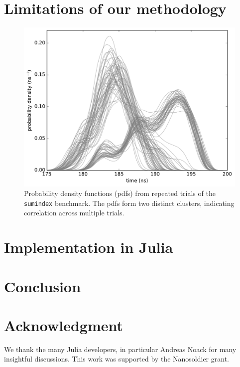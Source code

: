 \documentclass[conference]{IEEEtran}
\begin{document}
\label{sec:limits}
\section{Limitations of our methodology}

\begin{figure}[!t]
\centering
\includegraphics[width=\columnwidth]{figures/fig4/kde_pdf_sumindex}
\caption{Probability density functions (pdfs) from repeated trials of the
\lstinline|sumindex| benchmark. The pdfs form two distinct clusters, indicating
correlation across multiple trials.}
\label{fig:pdfsumindex}
\end{figure}

\label{sec:julia}
\section{Implementation in Julia}

\label{sec:conclusion}
\section{Conclusion}

\label{sec:acknowledgement}
\section*{Acknowledgment}

We thank the many Julia developers, in particular Andreas Noack for many insightful
discussions. This work was supported by the Nanosoldier grant.




\end{document}
